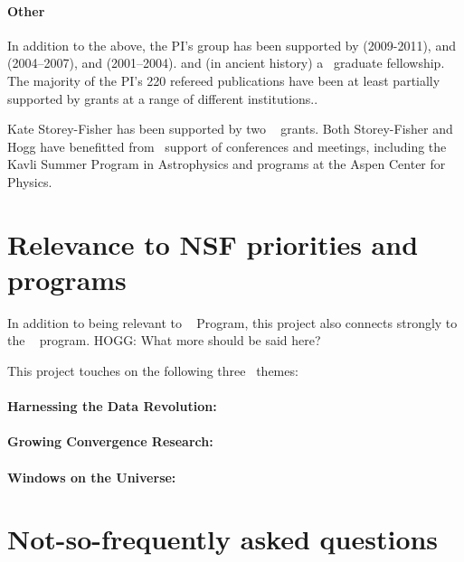 \documentclass[12pt, fullpage, letterpaper]{article}
\begin{document}
\paragraph{Other}
In addition to the above, the PI's group has been supported by
 (2009-2011),
and
 (2004--2007),
and
 (2001--2004).
and (in ancient history) a \NSF\ graduate fellowship.
The majority of the PI's 220 refereed publications have been at least partially supported
by \NSF grants at a range of different institutions..

Kate Storey-Fisher has been supported by two \NSF\  grants.
Both Storey-Fisher and Hogg have benefitted from \NSF\ support of conferences and meetings,
including the Kavli Summer Program in Astrophysics and programs at the Aspen Center for Physics.

\section{Relevance to NSF priorities and programs}

In addition to being relevant to \NSF\  Program, this project also
connects strongly to the \NSF\  program.
HOGG: What more should be said here?

This project touches on the following three \NSF\ themes:

\paragraph{Harnessing the Data Revolution:}

\paragraph{Growing Convergence Research:}

\paragraph{Windows on the Universe:}

\section{Not-so-frequently asked questions}
\end{document}
